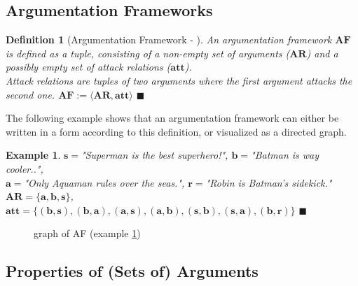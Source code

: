 \documentclass[12pt]{report}
\numberwithin{figure}{chapter}
\theoremstyle{break}
\newtheorem{defn}{Definition}[chapter]
\newtheorem{exmpl}{Example}[chapter]
\newenvironment{mydefn}{\begin{defn}}{$\blacksquare$ \end{defn}}
\newenvironment{myexmpl}{\begin{exmpl}}{$\blacksquare$ \end{exmpl}}
\begin{document}
\subsection{Argumentation Frameworks}
\begin{mydefn}[Argumentation Framework - \cite{Dung}]
An argumentation framework $\bm{AF}$ is defined as a tuple, consisting of a non-empty set of arguments ($\bm{AR}$) and a possibly empty set of attack relations ($\bm{att}$).\\
Attack relations are tuples of two arguments where the first argument attacks the second one.
$\bm{AF:=\langle AR,att \rangle}$
\end{mydefn}

The following example shows that an argumentation framework can either be written in a form according to this definition, or visualized as a directed graph.

\newpage

\begin{myexmpl}
$\bm{s=}$"Superman is the best superhero!", $\bm{b=}$"Batman is way cooler..",\\$\bm{a=}$"Only Aquaman rules over the seas.", $\bm{r=}$"Robin is Batman's sidekick."\\
$\bm{AR = \{a,b,s\}}$, $\bm{att=\{(b,s),(b,a),(a,s),(a,b),(s,b),(s,a),(b,r)\}}$
\label{a b s r}
\end{myexmpl}

\begin{figure}[h!]
\begin{center}\end{center}
\caption{graph of AF (example \ref{a b s r})}
\end{figure}

\subsection{Properties of (Sets of) Arguments}
\end{document}
